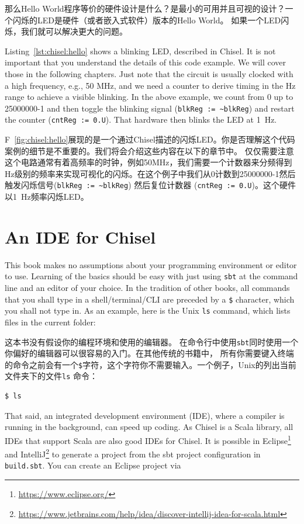 \documentclass[%
    10pt,
    headinclude, footexclude,
    openright, %
    notitlepage,
    cleardoubleempty,
    headsepline,
    pointlessnumbers,
    bibtotoc, idxtotoc,
    ]{scrbook}
\newcommand{\code}[1]{{\small{\texttt{#1}}}}
\newcommand{\myref}[2]{\href{#1}{#2}}
\renewcommand{\myref}[2]{{#2}{\footnote{\url{#1}}}}
\begin{document}
那么Hello World程序等价的硬件设计是什么？是最小的可用并且可视的设计？一个闪烁的LED是硬件（或者嵌入式软件）版本的Hello World。 
如果一个LED闪烁，我们就可以解决更大的问题。


Listing~\ref{lst:chisel:hello} shows a blinking LED, described in Chisel.
It is not important that you understand the details of this code example.
We will cover those in the following chapters. Just note that the circuit is
usually clocked with a high frequency, e.g., 50 MHz, and we need a counter
to derive timing in the Hz range to achieve a visible blinking. In the above
example, we count from 0 up to 25000000-1 and then toggle the blinking signal
(\code{blkReg := \textasciitilde blkReg}) and restart the counter (\code{cntReg := 0.U}).
That hardware then blinks the LED at 1~Hz.

F~\ref{fig:chisel:hello}展现的是一个通过Chisel描述的闪烁LED。你是否理解这个代码案例的细节是不重要的。我们将会介绍这些内容在以下的章节中。
仅仅需要注意这个电路通常有着高频率的时钟，例如50MHz，我们需要一个计数器来分频得到Hz级别的频率来实现可视化的闪烁。在这个例子中我们从0计数到25000000-1然后触发闪烁信号(\code{blkReg := \textasciitilde blkReg}) 
然后复位计数器 (\code{cntReg := 0.U})。这个硬件以1~Hz频率闪烁LED。

\section{An IDE for Chisel}

This book makes no assumptions about your programming environment or editor to use.
Learning of the basics should be easy with just using \code{sbt} at the command line
and an editor of your choice. In the tradition of other books, all commands that you
shall type in a shell/terminal/CLI are preceded by a \code{\$} character, which you
shall not type in. As an example, here is the Unix \code{ls} command, which lists files in
the current folder:

这本书没有假设你的编程环境和使用的编辑器。
在命令行中使用\code{sbt}同时使用一个你偏好的编辑器可以很容易的入门。在其他传统的书籍中，
所有你需要键入终端的命令之前会有一个\code{\$}字符，这个字符你不需要输入。一个例子，Unix的列出当前文件夹下的文件\code{ls}
命令：

\begin{verbatim}
$ ls
\end{verbatim}

That said, an integrated development environment (IDE), where a compiler is running in
the background, can speed up coding. As Chisel is a Scala library, all IDEs
that support Scala are also good IDEs for Chisel.
It is possible in \myref{https://www.eclipse.org/}{Eclipse} and
\myref{https://www.jetbrains.com/help/idea/discover-intellij-idea-for-scala.html}{IntelliJ}
to generate a project from the sbt project configuration in \code{build.sbt}.
You can create an Eclipse project via
\end{document}
